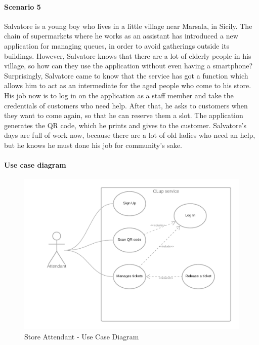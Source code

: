 \documentclass[table, 12pt]{article}
\begin{document}
\paragraph{Scenario 5}

Salvatore is a young boy who lives in a little village near Marsala, in Sicily. The chain of supermarkets where he works as an assistant has introduced a new application for managing queues, in order to avoid gatherings outside its buildings. However, Salvatore knows that there are a lot of elderly people in his village, so how can they use the application without even having a smartphone? Surprisingly, Salvatore came to know that the service has got a function which allows him to act as an intermediate for the aged people who come to his store. His job now is to log in on the application as a staff member and take the credentials of customers who need help. After that, he asks to customers when they want to come again, so that he can reserve them a slot. The application generates the QR code, which he prints and gives to the customer. Salvatore's days are full of work now, because there are a lot of old ladies who need an help, but he knows he must done his job for community's sake.

\paragraph{Use case diagram}
\begin{figure}[H]
    \begin{center}
        \includegraphics[width=\textwidth]{assets/Use-Case-Diagrams/use_case_diagram_assistant.png}
        \caption{Store Attendant - Use Case Diagram}
    \end{center}
\end{figure}
\end{document}
